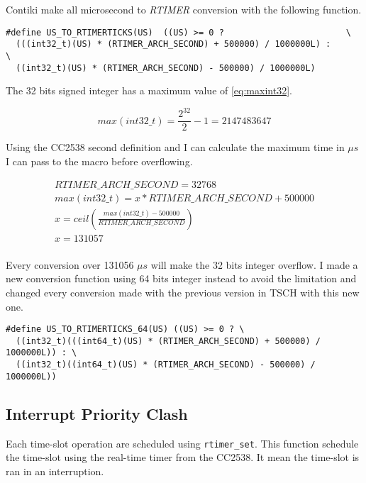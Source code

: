 Contiki make all microsecond to \emph{RTIMER} conversion with the following
function.

\begin{lstlisting}
#define US_TO_RTIMERTICKS(US)  ((US) >= 0 ?                        \
  (((int32_t)(US) * (RTIMER_ARCH_SECOND) + 500000) / 1000000L) :      \
  ((int32_t)(US) * (RTIMER_ARCH_SECOND) - 500000) / 1000000L)
\end{lstlisting}

The 32 bits signed integer has a maximum value of \ref{eq:maxint32}.

\begin{equation}
  \label{eq:maxint32}
  max(int32\_t) = \frac{2^{32}}{2} - 1 = 2147483647
\end{equation}

Using the CC2538 second definition and I can calculate the maximum time in $\mu s$
I can pass to the macro before overflowing.

\begin{equation}
  \label{eq:maxus}
  \begin{multlined}
  RTIMER\_ARCH\_SECOND = 32768 \\
  max(int32\_t) = x * RTIMER\_ARCH\_SECOND + 500000 \\
  x = ceil(\frac{max(int32\_t) - 500000}{RTIMER\_ARCH\_SECOND}) \\
  x = 131057 \\
  \end{multlined}
\end{equation}

Every conversion over 131056 $\mu s$ will make the 32 bits integer overflow.
I made a new conversion function using 64 bits integer instead to avoid the
limitation and changed every conversion made with the previous version in TSCH
with this new one.

\begin{lstlisting}
#define US_TO_RTIMERTICKS_64(US) ((US) >= 0 ? \
  ((int32_t)(((int64_t)(US) * (RTIMER_ARCH_SECOND) + 500000) / 1000000L)) : \
  ((int32_t)((int64_t)(US) * (RTIMER_ARCH_SECOND) - 500000) / 1000000L)) 
\end{lstlisting}

\subsection{Interrupt Priority Clash}

Each time-slot operation are scheduled using \lstinline{rtimer_set}.
This function schedule the time-slot using the real-time timer from the CC2538.
It mean the time-slot is ran in an interruption.

